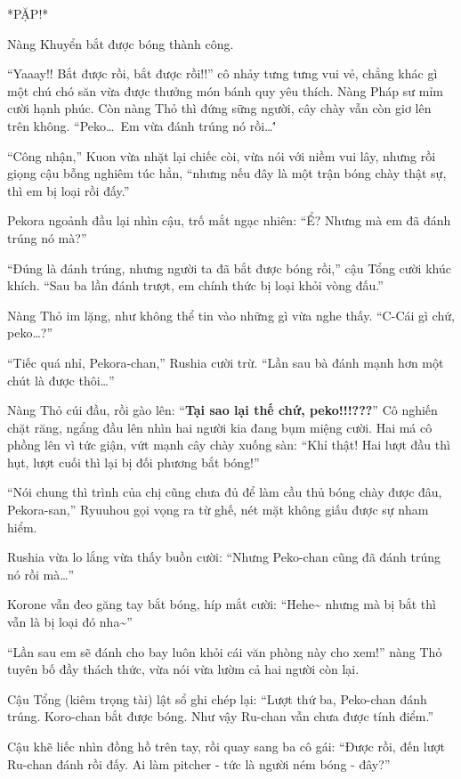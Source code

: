\documentclass[../main.tex]{subfiles}
\begin{document}
*PẶP!*

Nàng Khuyển bắt được bóng thành công.

``Yaaay!! Bắt được rồi, bắt được rồi!!'' cô nhảy tưng tưng vui vẻ, chẳng khác gì một chú chó săn vừa được thưởng món bánh quy yêu thích. Nàng Pháp sư mỉm cười hạnh phúc. Còn nàng Thỏ thì đứng sững người, cây chày vẫn còn giơ lên trên không. ``Peko\dots\ Em vừa đánh trúng nó rồi\dots\''

``Công nhận,'' Kuon vừa nhặt lại chiếc còi, vừa nói với niềm vui lây, nhưng rồi giọng cậu bỗng nghiêm túc hẳn, ``nhưng nếu đây là một trận bóng chày thật sự, thì em bị loại rồi đấy.''

Pekora ngoảnh đầu lại nhìn cậu, trố mắt ngạc nhiên: ``Ể? Nhưng mà em đã đánh trúng nó mà?''

``Đúng là đánh trúng, nhưng người ta đã bắt được bóng rồi,'' cậu Tổng cười khúc khích. ``Sau ba lần đánh trượt, em chính thức bị loại khỏi vòng đấu.''

Nàng Thỏ im lặng, như không thể tin vào những gì vừa nghe thấy. ``C-Cái gì chứ, peko\dots?''

``Tiếc quá nhỉ, Pekora-chan,'' Rushia cười trừ. ``Lần sau bà đánh mạnh hơn một chút là được thôi\dots''

Nàng Thỏ cúi đầu, rồi gào lên: ``\textbf{Tại sao lại thế chứ, peko!!!???}'' Cô nghiến chặt răng, ngẩng đầu lên nhìn hai người kia đang bụm miệng cười. Hai má cô phồng lên vì tức giận, vứt mạnh cây chày xuống sàn: ``Khỉ thật! Hai lượt đầu thì hụt, lượt cuối thì lại bị đối phương bắt bóng!''

``Nói chung thì trình của chị cũng chưa đủ để làm cầu thủ bóng chày được đâu, Pekora-san,'' Ryuuhou gọi vọng ra từ ghế, nét mặt không giấu được sự nham hiểm.

Rushia vừa lo lắng vừa thấy buồn cười: ``Nhưng Peko-chan cũng đã đánh trúng nó rồi mà\dots''

Korone vẫn đeo găng tay bắt bóng, híp mắt cười: ``Hehe\~{} nhưng mà bị bắt thì vẫn là bị loại đó nha\~{}''

``Lần sau em sẽ đánh cho bay luôn khỏi cái văn phòng này cho xem!'' nàng Thỏ tuyên bố đầy thách thức, vừa nói vừa lườm cả hai người còn lại.

Cậu Tổng (kiêm trọng tài) lật sổ ghi chép lại: ``Lượt thứ ba, Peko-chan đánh trúng. Koro-chan bắt được bóng. Như vậy Ru-chan vẫn chưa được tính điểm.''

Cậu khẽ liếc nhìn đồng hồ trên tay, rồi quay sang ba cô gái: ``Được rồi, đến lượt Ru-chan đánh rồi đấy. Ai làm pitcher - tức là người ném bóng - đây?''
\end{document}
